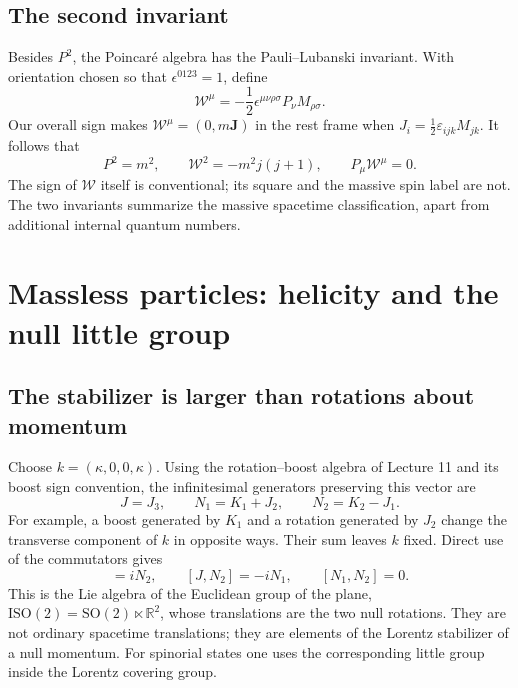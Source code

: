 \documentclass[11pt]{article}
\newcommand{\R}{\mathbb{R}}
\newcommand{\SO}{\mathrm{SO}}
\newcommand{\eps}{\varepsilon}
\newcommand{\ISO}{\mathrm{ISO}}
\begin{document}
\subsection{The second invariant}
Besides \(P^2\), the Poincar\'e algebra has the Pauli--Lubanski
invariant. With orientation chosen so that \(\epsilon^{0123}=1\),
define
\begin{equation}
 \mathcal W^\mu=-\frac12\epsilon^{\mu\nu\rho\sigma}
                        P_\nu M_{\rho\sigma}.
 \label{eq:PL}
\end{equation}
Our overall sign makes \(\mathcal W^\mu=(0,m\bm J)\) in the rest
frame when \(J_i=\tfrac12\eps_{ijk}M_{jk}\). It follows that
\begin{equation}
 P^2=m^2,\qquad
 \mathcal W^2=-m^2j(j+1),\qquad P_\mu\mathcal W^\mu=0.
 \label{eq:casimirs}
\end{equation}
The sign of \(\mathcal W\) itself is conventional; its square and
the massive spin label are not. The two invariants summarize the
massive spacetime classification, apart from additional internal
quantum numbers.

\section{Massless particles: helicity and the null little group}
\subsection{The stabilizer is larger than rotations about momentum}
Choose \(k=(\kappa,0,0,\kappa)\). Using the rotation--boost algebra
of Lecture 11 and its boost sign convention, the infinitesimal
generators preserving this vector are
\begin{equation}
 J=J_3,\qquad N_1=K_1+J_2,\qquad N_2=K_2-J_1.
 \label{eq:nullgens}
\end{equation}
For example, a boost generated by \(K_1\) and a rotation generated
by \(J_2\) change the transverse component of \(k\) in opposite
ways. Their sum leaves \(k\) fixed. Direct use of the commutators gives
\begin{equation}
 [J,N_1]=iN_2,\qquad [J,N_2]=-iN_1,\qquad [N_1,N_2]=0.
 \label{eq:iso2}
\end{equation}
This is the Lie algebra of the Euclidean group of the plane,
\(\ISO(2)=\SO(2)\ltimes\R^2\), whose translations are the two
null rotations. They are not ordinary spacetime translations;
they are elements of the Lorentz stabilizer of a null momentum.
For spinorial states one uses the corresponding little group inside
the Lorentz covering group.
\end{document}
